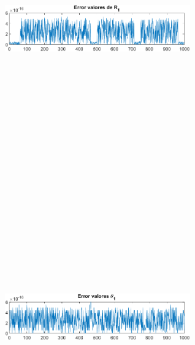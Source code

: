 \documentclass[12pt]{article}
\begin{document}
\begin{multicols}{2}
\begin{figure} [H]
        \centerline{\includegraphics[width=8cm, height=12cm,keepaspectratio]{Error/Error R1.png}}
    \end{figure}
    \vspace{-25pt}
        \begin{figure} [H]
        \centerline{\includegraphics[width=8cm, height=12cm,keepaspectratio]{Error/Error theta1.png}}

\end{figure}
\end{multicols}
\end{document}
